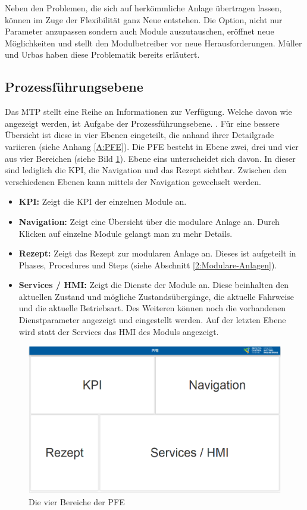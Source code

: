 Neben den Problemen, die sich auf herkömmliche Anlage übertragen lassen, können im Zuge der Flexibilität ganz Neue entstehen. Die Option, nicht nur Parameter anzupassen sondern auch Module auszutauschen, eröffnet neue Möglichkeiten und stellt den Modulbetreiber vor neue Herausforderungen. Müller und Urbas \cite{Muller2017} haben diese Problematik bereits erläutert.

\subsection{Prozessführungsebene}
\label{3:PFE}
Das MTP stellt eine Reihe an Informationen zur Verfügung. Welche davon wie angezeigt werden, ist Aufgabe der Prozessführungsebene.  . Für eine bessere Übersicht ist diese in vier Ebenen eingeteilt, die anhand ihrer Detailgrade variieren (siehe Anhang \ref{A:PFE}). Die PFE besteht in Ebene zwei, drei und vier aus vier Bereichen (siehe Bild \ref{pic:Bereiche-PFE}). Ebene eins unterscheidet sich davon. In dieser sind lediglich die KPI, die Navigation und das Rezept sichtbar. Zwischen den verschiedenen Ebenen kann mittels der Navigation gewechselt werden.
\begin{itemize}
\item \textbf{KPI:} Zeigt die KPI der einzelnen Module an.
\item \textbf{Navigation:} Zeigt eine Übersicht über die modulare Anlage an. Durch Klicken auf einzelne Module gelangt man zu mehr Details.
\item \textbf{Rezept:} Zeigt das Rezept zur modularen Anlage an. Dieses ist aufgeteilt in Phases, Procedures und Steps (siehe Abschnitt \ref{2:Modulare-Anlagen}).
\item \textbf{Services / HMI:} Zeigt die Dienste der Module an. Diese beinhalten den aktuellen Zustand und mögliche Zustandsübergänge, die aktuelle Fahrweise und die aktuelle Betriebsart. Des Weiteren können noch die vorhandenen Dienstparameter angezeigt und eingestellt werden. Auf der letzten Ebene wird statt der Services das HMI des Moduls angezeigt.
\end{itemize}
\begin{figure}[h]
\centering
\includegraphics[scale=0.25]{DA_files/Bilder/Analyse/PFE-Bereiche.png}
\caption{Die vier Bereiche der PFE}
\label{pic:Bereiche-PFE}
\end{figure}


